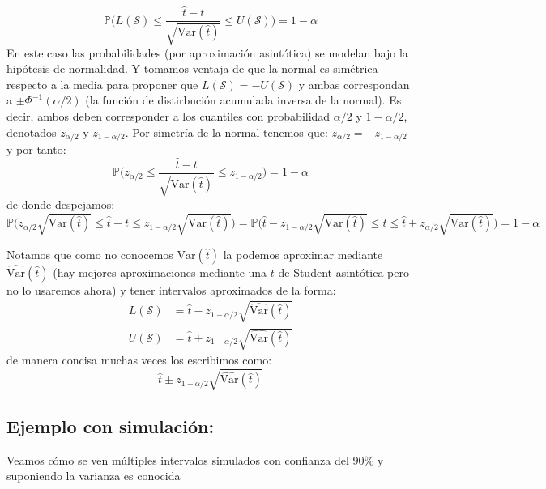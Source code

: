 \documentclass[
]{book}
\begin{document}
\[
\mathbb{P}\Bigg( L(\mathcal{S}) \leq \dfrac{\hat{t} - t}{\sqrt{\textrm{Var}(\hat{t})}} \leq U(\mathcal{S}) \Bigg) = 1 - \alpha
\]
En este caso las probabilidades (por aproximación asintótica) se modelan bajo la hipótesis de normalidad. Y tomamos ventaja de que la normal es simétrica respecto a la media para proponer que \(L(\mathcal{S}) = -U(\mathcal{S})\) y ambas correspondan a \(\pm \Phi^{-1}(\alpha/2)\) (la función de distirbución acumulada inversa de la normal). Es decir, ambos deben corresponder a los cuantiles con probabilidad \(\alpha/2\) y \(1 - \alpha/2\), denotados \(z_{\alpha/2}\) y \(z_{1 - \alpha/2}\). Por simetría de la normal tenemos que: \(z_{\alpha/2} = - z_{1 - \alpha/2}\) y por tanto:
\[
\mathbb{P}\Bigg( z_{\alpha/2} \leq \dfrac{\hat{t} - t}{\sqrt{\textrm{Var}(\hat{t})}} \leq  z_{1 -\alpha/2} \Bigg) = 1 - \alpha
\]
de donde despejamos:
\[
\mathbb{P}\Bigg( z_{\alpha/2}\sqrt{\textrm{Var}(\hat{t})} \leq \hat{t} - t \leq z_{1- \alpha/2}\sqrt{\textrm{Var}(\hat{t})} \Bigg) = \mathbb{P}\Bigg( \hat{t} - z_{1-\alpha/2}\sqrt{\textrm{Var}(\hat{t})} \leq t \leq \hat{t} +  z_{ \alpha/2}\sqrt{\textrm{Var}(\hat{t})} \Bigg)  =  1 - \alpha
\]

Notamos que como no conocemos \(\textrm{Var}(\hat{t})\) la podemos aproximar mediante \(\widehat{\textrm{Var}}(\hat{t})\) (hay mejores aproximaciones mediante una \(t\) de Student asintótica pero no lo usaremos ahora) y tener intervalos aproximados de la forma:
\begin{equation}
\begin{aligned}
L(\mathcal{S}) & =  \hat{t} - z_{1-\alpha/2}\sqrt{\widehat{\textrm{Var}}(\hat{t})} \\
U(\mathcal{S}) & =  \hat{t} + z_{1-\alpha/2}\sqrt{\widehat{\textrm{Var}}(\hat{t})}
\end{aligned}
\end{equation}
de manera concisa muchas veces los escribimos como:
\[
 \hat{t} \pm z_{1-\alpha/2}\sqrt{\widehat{\textrm{Var}}(\hat{t})}
\]

\hypertarget{ejemplo-con-simulaciuxf3n}{%
\subsection{Ejemplo con simulación:}\label{ejemplo-con-simulaciuxf3n}}

Veamos cómo se ven múltiples intervalos simulados con confianza del \(90\%\) y suponiendo la varianza es conocida
\end{document}
